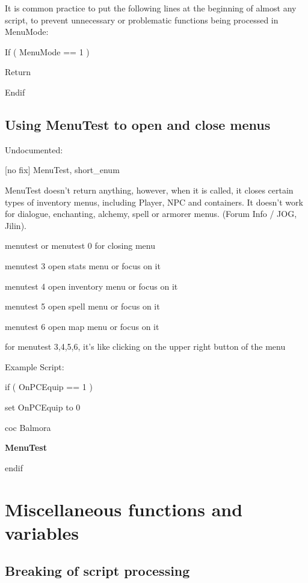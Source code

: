 It is common practice to put the following lines at the beginning of
almost any script, to prevent unnecessary or problematic functions being
processed in MenuMode:

If ( MenuMode == 1 )

Return

Endif

\hypertarget{using-menutest-to-open-and-close-menus}{%
\subsection{Using MenuTest to open and close
menus}\label{using-menutest-to-open-and-close-menus}}

Undocumented:

{[}no fix{]} MenuTest, short\_enum

MenuTest doesn't return anything, however, when it is called, it closes
certain types of inventory menus, including Player, NPC and containers.
It doesn't work for dialogue, enchanting, alchemy, spell or armorer
menus. (Forum Info / JOG, Jilin).

menutest or menutest 0 for closing menu

menutest 3 open stats menu or focus on it

menutest 4 open inventory menu or focus on it

menutest 5 open spell menu or focus on it

menutest 6 open map menu or focus on it

for menutest 3,4,5,6, it's like clicking on the upper right button of
the menu

Example Script:

if ( OnPCEquip == 1 )

set OnPCEquip to 0

coc Balmora

\textbf{MenuTest}

endif

\hypertarget{miscellaneous-functions-and-variables}{%
\section{\texorpdfstring{\hfill\break
Miscellaneous functions and
variables}{ Miscellaneous functions and variables}}\label{miscellaneous-functions-and-variables}}

\hypertarget{breaking-of-script-processing}{%
\subsection{Breaking of script
processing}\label{breaking-of-script-processing}}

